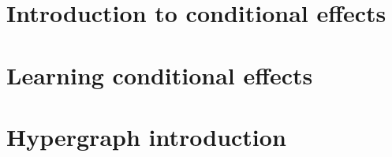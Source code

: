 \documentclass[Master.tex]{subfiles}
\begin{document}
\section{Introduction to conditional effects}
    

\section{Learning conditional effects}
    

\section{Hypergraph introduction}
    

% 	
%
%     
%
% 	
%
% 	
\end{document}
